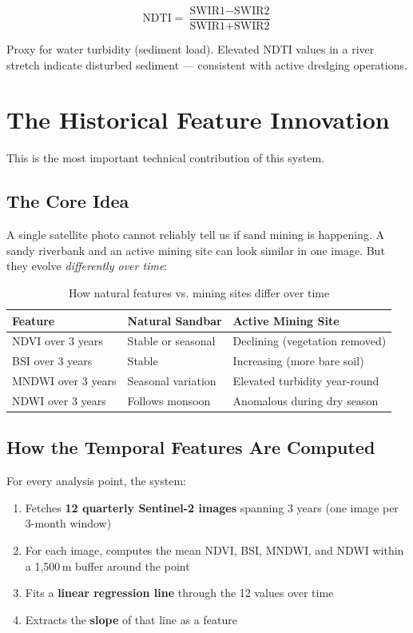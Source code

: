 \documentclass[12pt, a4paper]{article}
\begin{document}
\[
  \text{NDTI} = \frac{\text{SWIR1} - \text{SWIR2}}{\text{SWIR1} + \text{SWIR2}}
\]

Proxy for water turbidity (sediment load). Elevated NDTI values in
a river stretch indicate disturbed sediment --- consistent with
active dredging operations.

\section{The Historical Feature Innovation}

This is the most important technical contribution of this system.

\subsection{The Core Idea}

A single satellite photo cannot reliably tell us if sand mining is
happening. A sandy riverbank and an active mining site can look similar
in one image. But they evolve \emph{differently over time}:

\begin{table}[H]
\centering
\begin{tabular}{lll}
\toprule
\textbf{Feature} & \textbf{Natural Sandbar} & \textbf{Active Mining Site} \\
\midrule
NDVI over 3 years & Stable or seasonal & Declining (vegetation removed) \\
BSI over 3 years & Stable & Increasing (more bare soil) \\
MNDWI over 3 years & Seasonal variation & Elevated turbidity year-round \\
NDWI over 3 years & Follows monsoon & Anomalous during dry season \\
\bottomrule
\end{tabular}
\caption{How natural features vs. mining sites differ over time}
\end{table}

\subsection{How the Temporal Features Are Computed}

For every analysis point, the system:

\begin{enumerate}
  \item Fetches \textbf{12 quarterly Sentinel-2 images} spanning 3 years
        (one image per 3-month window)
  \item For each image, computes the mean NDVI, BSI, MNDWI, and NDWI
        within a 1,500\,m buffer around the point
  \item Fits a \textbf{linear regression line} through the 12 values over time
  \item Extracts the \textbf{slope} of that line as a feature
\end{enumerate}
\end{document}
